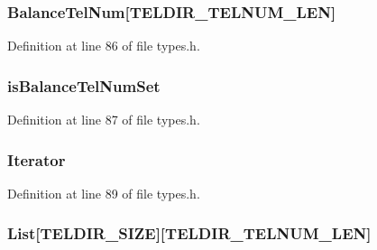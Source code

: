 \subsubsection[{Balance\+Tel\+Num}]{ Balance\+Tel\+Num\mbox{[}{\bf T\+E\+L\+D\+I\+R\+\_\+\+T\+E\+L\+N\+U\+M\+\_\+\+L\+E\+N}\mbox{]}}\label{struct_tel_dir___type_def_a3f3c99353bd68df9c2a2883156c74b4f}


Definition at line 86 of file types.\+h.

\hypertarget{struct_tel_dir___type_def_abb5d78a0d404af96d31c3cf9255aa270}{}
\subsubsection[{is\+Balance\+Tel\+Num\+Set}]{ is\+Balance\+Tel\+Num\+Set}\label{struct_tel_dir___type_def_abb5d78a0d404af96d31c3cf9255aa270}


Definition at line 87 of file types.\+h.

\hypertarget{struct_tel_dir___type_def_a020857a514cc8d2c6dee60d096ae33a3}{}
\subsubsection[{Iterator}]{ Iterator}\label{struct_tel_dir___type_def_a020857a514cc8d2c6dee60d096ae33a3}


Definition at line 89 of file types.\+h.

\hypertarget{struct_tel_dir___type_def_ae296be071cbe46eed001ab486d4882bb}{}
\subsubsection[{List}]{ List\mbox{[}{\bf T\+E\+L\+D\+I\+R\+\_\+\+S\+I\+Z\+E}\mbox{]}\mbox{[}{\bf T\+E\+L\+D\+I\+R\+\_\+\+T\+E\+L\+N\+U\+M\+\_\+\+L\+E\+N}\mbox{]}}\label{struct_tel_dir___type_def_ae296be071cbe46eed001ab486d4882bb}


